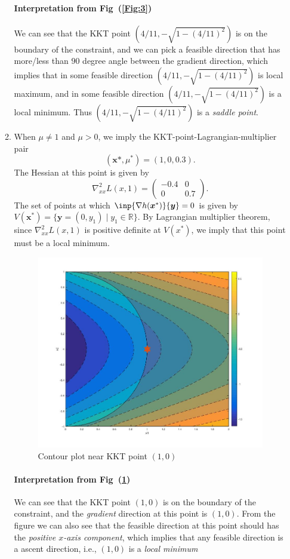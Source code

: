 \begin{enumerate}
\begin{enumerate}
\paragraph{Interpretation from Fig~(\ref{Fig:3})}We can see that the KKT point $(4/11,-\sqrt{1-(4/11)^2})$ is on the boundary of the constraint, and we can pick a feasible direction that has more/less than $90$ degree angle between the gradient direction, which implies that in some feasible direction $(4/11,-\sqrt{1-(4/11)^2})$ is local maximum, and in some feasible direction $(4/11,-\sqrt{1-(4/11)^2})$ is a local minimum. Thus $(4/11,-\sqrt{1-(4/11)^2})$ is a \emph{saddle point}.
\item
When $\mu\ne1$ and $\mu>0$, we imply the KKT-point-Lagrangian-multiplier pair
\[
(\bm x*,\mu^*)=(1,0,0.3).
\]
The Hessian at this point is given by
\[
\nabla^2_{xx}L(x,1)=\begin{pmatrix}
-0.4&0\\0&0.7
\end{pmatrix}.
\]
The set of points at which $\inp{\nabla h(\bm x^*)}{\bm y}=0$ is given by $V(\bm x^*)=\{\bm y=(0,y_1)\mid y_1\in\mathbb{R}\}$. By Lagrangian multiplier theorem, since $\nabla^2_{xx}L(x,1)$ is positive definite at $V(x^*)$, we imply that this point must be a local minimum.
\begin{figure}[H]
\includegraphics[width=1\textwidth]{A_7_4}
\centering
\caption{Contour plot near KKT point $(1,0)$}
\label{Fig:4}
\end{figure}
\paragraph{Interpretation from Fig~(\ref{Fig:4})}We can see that the KKT point $(1,0)$ is on the boundary of the constraint, and the \emph{gradient} direction at this point is $(1,0)$. From the figure we can also see that the feasible direction at this point should has the \emph{positive $x$-axis component}, which implies that any feasible direction is a ascent direction, i.e., $(1,0)$ is a \emph{local minimum}



\end{enumerate}
\end{enumerate}
